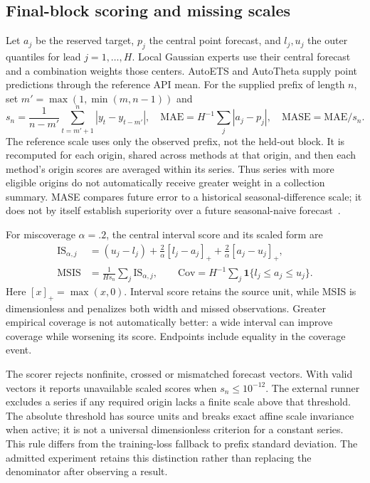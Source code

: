 \subsection{Final-block scoring and missing scales}
\label{sec:scoring}
Let $a_j$ be the reserved target, $p_j$ the central point forecast, and $l_j,u_j$ the outer quantiles for lead $j=1,\ldots,H$. Local Gaussian experts use their central forecast and a combination weights those centers. AutoETS and AutoTheta supply point predictions through the reference API mean. For the supplied prefix of length $n$, set $m'=\max(1,\min(m,n-1))$ and
\begin{equation}
 s_n=\frac{1}{n-m'}\sum_{t=m'+1}^{n}|y_t-y_{t-m'}|,
 \quad \mathrm{MAE}=H^{-1}\sum_j|a_j-p_j|,
 \quad \mathrm{MASE}=\mathrm{MAE}/s_n.
\end{equation}
The reference scale uses only the observed prefix, not the held-out block. It is recomputed for each origin, shared across methods at that origin, and then each method's origin scores are averaged within its series. Thus series with more eligible origins do not automatically receive greater weight in a collection summary. MASE compares future error to a historical seasonal-difference scale; it does not by itself establish superiority over a future seasonal-naive forecast~\cite{mase}.

For miscoverage $\alpha=.2$, the central interval score and its scaled form are~\cite{proper}
\begin{align}
 \mathrm{IS}_{\alpha,j}&=(u_j-l_j)+\frac{2}{\alpha}[l_j-a_j]_+
                         +\frac{2}{\alpha}[a_j-u_j]_+,\\
 \mathrm{MSIS}&=\frac{1}{Hs_n}\sum_j\mathrm{IS}_{\alpha,j},\qquad
 \mathrm{Cov}=H^{-1}\sum_j\mathbf1\{l_j\le a_j\le u_j\}.
\end{align}
Here $[x]_+=\max(x,0)$. Interval score retains the source unit, while MSIS is dimensionless and penalizes both width and missed observations. Greater empirical coverage is not automatically better: a wide interval can improve coverage while worsening its score. Endpoints include equality in the coverage event.

The scorer rejects nonfinite, crossed or mismatched forecast vectors. With valid vectors it reports unavailable scaled scores when $s_n\le10^{-12}$. The external runner excludes a series if any required origin lacks a finite scale above that threshold. The absolute threshold has source units and breaks exact affine scale invariance when active; it is not a universal dimensionless criterion for a constant series. This rule differs from the training-loss fallback to prefix standard deviation. The admitted experiment retains this distinction rather than replacing the denominator after observing a result.
